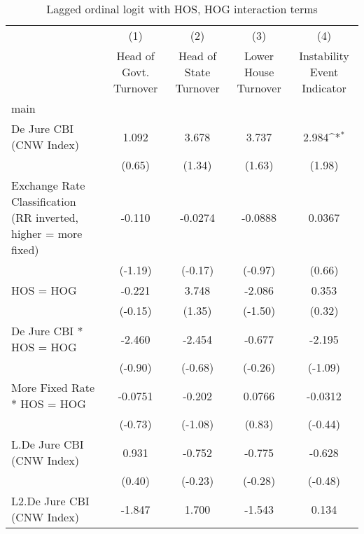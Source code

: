 {
\def\sym#1{\ifmmode^{#1}\else\(^{#1}\)\fi}
\begin{longtable}{l*{4}{c}}
\caption{Lagged ordinal logit with HOS, HOG interaction terms \label{hoshogintlagordLogLogDJ}}\\
\hline\hline\endfirsthead\hline\endhead\hline\endfoot\endlastfoot
                &\multicolumn{1}{c}{(1)}&\multicolumn{1}{c}{(2)}&\multicolumn{1}{c}{(3)}&\multicolumn{1}{c}{(4)}\\
                &\multicolumn{1}{c}{Head of Govt. Turnover}&\multicolumn{1}{c}{Head of State Turnover}&\multicolumn{1}{c}{Lower House Turnover}&\multicolumn{1}{c}{Instability Event Indicator}\\
\hline
main            &                  &                  &                  &                  \\
De Jure CBI (CNW Index)&    1.092         &    3.678         &    3.737         &    2.984\sym{*}  \\
                &   (0.65)         &   (1.34)         &   (1.63)         &   (1.98)         \\
[1em]
Exchange Rate Classification (RR inverted, higher = more fixed)&   -0.110         &  -0.0274         &  -0.0888         &   0.0367         \\
                &  (-1.19)         &  (-0.17)         &  (-0.97)         &   (0.66)         \\
[1em]
HOS = HOG       &   -0.221         &    3.748         &   -2.086         &    0.353         \\
                &  (-0.15)         &   (1.35)         &  (-1.50)         &   (0.32)         \\
[1em]
De Jure CBI * HOS = HOG&   -2.460         &   -2.454         &   -0.677         &   -2.195         \\
                &  (-0.90)         &  (-0.68)         &  (-0.26)         &  (-1.09)         \\
[1em]
More Fixed Rate * HOS = HOG&  -0.0751         &   -0.202         &   0.0766         &  -0.0312         \\
                &  (-0.73)         &  (-1.08)         &   (0.83)         &  (-0.44)         \\
[1em]
L.De Jure CBI (CNW Index)&    0.931         &   -0.752         &   -0.775         &   -0.628         \\
                &   (0.40)         &  (-0.23)         &  (-0.28)         &  (-0.48)         \\
[1em]
L2.De Jure CBI (CNW Index)&   -1.847         &    1.700         &   -1.543         &    0.134         \\

\end{longtable}}
